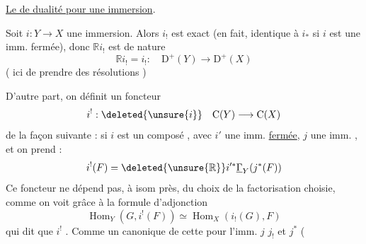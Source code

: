 \uline{Le  de dualité pour une immersion}.


Soit $i:Y\longrightarrow X$ une immersion.
Alors $i_!$ est exact (en fait, identique à $i_*$ si
$i$ est une imm. fermée), donc
$\mathbb{R}i_!$ est de nature 
\[
\mathbb{R}i_!=i_!:\quad \mathrm{D}^+(Y)\longrightarrow\mathrm{D}^+(X)
\]
( ici de prendre des résolutions )

D'autre part, on définit un foncteur
\[
i^!:\deleted{\unsure{i}}\quad \mathrm{C}(Y)\longrightarrow\mathrm{C}(X)
\]
de la façon suivante : si $i$ est un
composé
, avec $i'$ une
imm. \uline{fermée}, $j$ une imm. ,
et on prend :
\[
i^!(F)=\deleted{\unsure{\mathbb{R}}}i'^*\underline{\Gamma}_Y(j^*(F))
\]
Ce foncteur ne dépend pas, à isom 
près, du choix de la factorisation choisie,
comme on voit  grâce à la
formule d'adjonction
\[
\operatorname{Hom}_Y(G,i^!(F))\simeq\operatorname{Hom}_X(i_!(G),F)
\]
qui dit que $i^!$ .
Comme    un 
canonique de cette  pour 
l'imm.  $j$  $j_!$ et $j^*$ (
